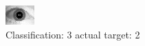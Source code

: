 \begin{figure}[h!]
\begin{center}
\includegraphics[width=0.60\columnwidth]{figures/ID1760_class_3_target_2.png}
\end{center}
\caption{ Classification: 3 actual target: 2}
\label{fig:ID1760_class_3_target_2}
\end{figure}
